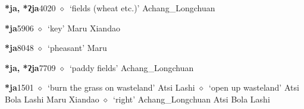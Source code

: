   \begin{list}{}{\leftmargin=1.5em \itemindent=-1.5em}
  \item {\footnotesize \textbf{*ja, *ʔja}}{\tiny 4020}
         $\diamond$~`fields (wheat etc.)'
         Achang\_Longchuan 
  \item {\footnotesize \textbf{*ja}}{\tiny 5906}
\hspace{1ex}
         $\diamond$~`key'
         Maru 
\hspace{1ex}
         Xiandao 
  \item {\footnotesize \textbf{*ja}}{\tiny 8048}
\hspace{1ex}
         $\diamond$~`pheasant'
         Maru 
  \item {\footnotesize \textbf{*ja, *ʔja}}{\tiny 7709}
\hspace{1ex}
         $\diamond$~`paddy fields'
         Achang\_Longchuan 
  \item {\footnotesize \textbf{*ja}}{\tiny 1501}
\hspace{1ex}
         $\diamond$~`burn the grass on wasteland'
         Atsi 
\hspace{1ex}
         Lashi 
\hspace{1ex}
         $\diamond$~`open up wasteland'
         Atsi 
\hspace{1ex}
         Bola 
\hspace{1ex}
         Lashi 
\hspace{1ex}
         Maru 
\hspace{1ex}
         Xiandao 
\hspace{1ex}
         $\diamond$~`right'
         Achang\_Longchuan 
\hspace{1ex}
         Atsi 
\hspace{1ex}
         Bola 
\hspace{1ex}
         Lashi 
\hspace{1ex}

\end{list}
